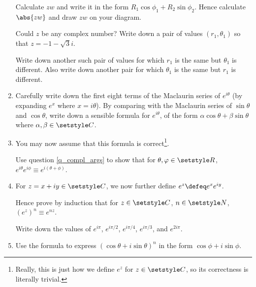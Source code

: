 \begin{enumerate}
  Calculate \(zw\) and write it in the form
  \(R_1 \cos \phi_1 + R_2 \sin \phi_2\). Hence calculate \(\abs{zw}\) and draw
  \(zw\) on your diagram.

  Could \(z\) be any complex number? Write down a pair of values
  \((r_1, \theta_1)\) so that \(z = -1 - \sqrt 3i\).

  Write down another such pair of values for which \(r_1\) is the same but
  \(\theta_1\) is different. Also write down another pair for which
  \(\theta_1\) is the same but \(r_1\) is different.
 \item
  Carefully write down the first eight terms of the Maclaurin series of
  \(e^{i\theta}\) (by expanding \(e^x\) where \(x = i\theta\)). By comparing
  with the Maclaurin series of \(\sin \theta\) and \(\cos \theta\), write down a
  sensible formula for \(e^{i\theta}\), of the form
  \(\alpha \cos \theta + \beta \sin \theta\) where
  \(\alpha, \beta \in \Complex\).
 \item
  You may now assume that this formula is correct\footnote{
   Really, this is just how we define \(e^z\) for \(z \in \Complex\), so its
   correctness is literally trivial.
  }.

  Use question \ref{q_compl_args} to show that for \(\theta, \phi \in \Reals\),
  \(e^{i\theta} e^{i\phi} \equiv e^{i(\theta + \phi)}\).
 \item
  For \(z = x + iy \in \Complex\), we now further define
  \(e^z \defeq e^x e^{iy}\).

  Hence prove by induction that for \(z \in \Complex\), \(n \in \Naturals\),
  \((e^z)^n \equiv e^{nz}\).

  Write down the values of \(e^{i\pi}\), \(e^{i\pi / 2}\),
  \(e^{i\pi / 4}\), \(e^{i\pi / 3}\), and \(e^{2 i \pi}\).
 \item
  Use the formula to express
  \((\cos \theta + i \sin \theta)^n\) in the form \(\cos \phi + i \sin \phi\).


\end{enumerate}

